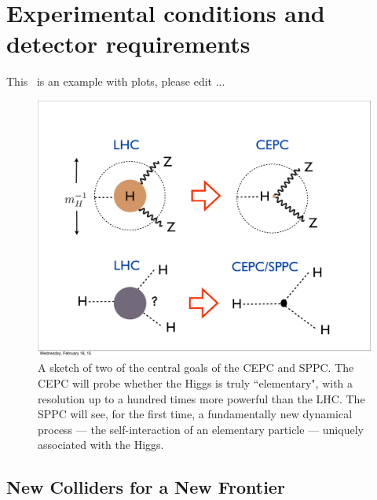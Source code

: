 \chapter{Experimental conditions and detector requirements}
\label{Chapter:ExperimentalConditions}


This~\cite{cepc_website} is an example with plots, please edit ... 
%
\begin{figure}[h!]
\centering
\includegraphics[scale=0.36]{Figures/ExperimentalConditions/main_theme}
\caption{A sketch of two of the central goals of the CEPC and SPPC. The CEPC will probe whether the Higgs is truly ``elementary", with a resolution up to a hundred times more powerful than the LHC. The SPPC will see, for the first time, a fundamentally new dynamical process --- the self-interaction of an elementary particle --- uniquely associated with the Higgs.}
\label{fig:main_theme}
\end{figure}
%
\section{New Colliders for a New Frontier}


